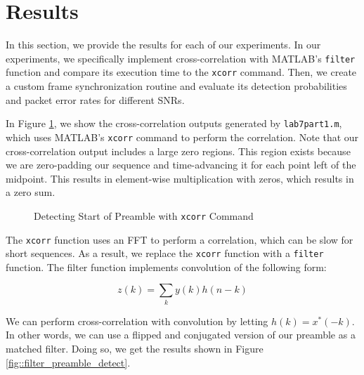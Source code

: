 \documentclass{article}
\begin{document}
\section{Results}

In this section, we provide the results for each of our experiments. In our experiments, we specifically implement cross-correlation with MATLAB's \texttt{filter} function and compare its execution time to the \texttt{xcorr} command. Then, we create a custom frame synchronization routine and evaluate its detection probabilities and packet error rates for different SNRs.

In Figure \ref{fig::xcorr_preamble_detect}, we show the cross-correlation outputs generated by \texttt{lab7part1.m}, which uses MATLAB's \texttt{xcorr} command to perform the correlation. Note that our cross-correlation output includes a large zero regions. This region exists because we are zero-padding our sequence and time-advancing it for each point left of the midpoint. This results in element-wise multiplication with zeros, which results in a zero sum.

\begin{figure}[H]
	\centerline{}
	\caption{Detecting Start of Preamble with \texttt{xcorr} Command}
	\label{fig::xcorr_preamble_detect}
\end{figure}

The \texttt{xcorr} function uses an FFT to perform a correlation, which can be slow for short sequences. As a result, we replace the \texttt{xcorr} function with a \texttt{filter} function. The filter function implements convolution of the following form:

\begin{equation}
	z(k) = \sum_{k}{y(k)h(n-k)}
\end{equation}

\noindent We can perform cross-correlation with convolution by letting $h(k) = x^*(-k)$. In other words, we can use a flipped and conjugated version of our preamble as a matched filter. Doing so, we get the results shown in Figure \ref{fig::filter_preamble_detect}.
\end{document}
